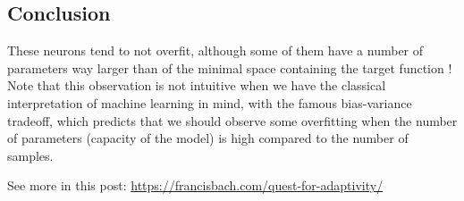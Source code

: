 \documentclass[
10pt, %
a4paper, %
oneside, %
headinclude,footinclude, %
BCOR5mm, %
]{scrartcl}
\begin{document}
\subsection{Conclusion}

These neurons tend to not overfit, although some of them have a number of parameters
way larger than of the minimal space containing the target function ! Note that this observation is not intuitive when we have the classical interpretation of machine learning in mind, with the famous bias-variance tradeoff, which predicts that we should observe some overfitting when the number of parameters (capacity of the model) is high compared to the number of samples.

See more in this post:  \url{https://francisbach.com/quest-for-adaptivity/} 


 
\end{document}
